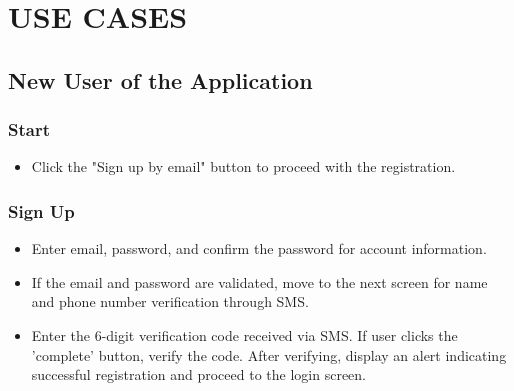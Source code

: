\documentclass[conference]{IEEEtran}
\begin{document}
\section{USE CASES}

\subsection{New User of the Application}

\subsubsection{Start}
\begin{itemize}
    \begin{itemize}
        \item Click the "Sign up by email" button to proceed with the registration.
        \vspace{0.3cm}
    \end{itemize}
\end{itemize}

\subsubsection{Sign Up}
\begin{itemize} 
    \begin{itemize}
        \item Enter email, password, and confirm the password for account information.
        \item If the email and password are validated, move to the next screen for name and phone number verification through SMS.
        \item Enter the 6-digit verification code received via SMS. If user clicks the 'complete' button, verify the code. After verifying, display an alert indicating successful registration and proceed to the login screen.
        \vspace{0.3cm}
    \end{itemize}
\end{itemize}
\end{document}
